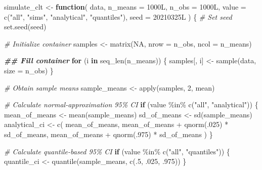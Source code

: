 \documentclass[
  11pt,
]{article}
\newenvironment{Shaded}{\begin{snugshade}}{\end{snugshade}}
\newcommand{\AttributeTok}[1]{\textcolor[rgb]{0.77,0.63,0.00}{#1}}
\newcommand{\CommentTok}[1]{\textcolor[rgb]{0.56,0.35,0.01}{\textit{#1}}}
\newcommand{\ConstantTok}[1]{\textcolor[rgb]{0.00,0.00,0.00}{#1}}
\newcommand{\ControlFlowTok}[1]{\textcolor[rgb]{0.13,0.29,0.53}{\textbf{#1}}}
\newcommand{\DecValTok}[1]{\textcolor[rgb]{0.00,0.00,0.81}{#1}}
\newcommand{\DocumentationTok}[1]{\textcolor[rgb]{0.56,0.35,0.01}{\textbf{\textit{#1}}}}
\newcommand{\FunctionTok}[1]{\textcolor[rgb]{0.00,0.00,0.00}{#1}}
\newcommand{\NormalTok}[1]{#1}
\newcommand{\OtherTok}[1]{\textcolor[rgb]{0.56,0.35,0.01}{#1}}
\newcommand{\SpecialCharTok}[1]{\textcolor[rgb]{0.00,0.00,0.00}{#1}}
\newcommand{\StringTok}[1]{\textcolor[rgb]{0.31,0.60,0.02}{#1}}
\begin{document}
\begin{Shaded}
\begin{Highlighting}[]
\NormalTok{simulate\_clt }\OtherTok{\textless{}{-}} \ControlFlowTok{function}\NormalTok{(}
\NormalTok{  data,}
  \AttributeTok{n\_means =}\NormalTok{ 1000L,}
  \AttributeTok{n\_obs =}\NormalTok{ 1000L,}
  \AttributeTok{value =} \FunctionTok{c}\NormalTok{(}\StringTok{"all"}\NormalTok{, }\StringTok{"sims"}\NormalTok{, }\StringTok{"analytical"}\NormalTok{, }\StringTok{"quantiles"}\NormalTok{),}
  \AttributeTok{seed =}\NormalTok{ 20210325L}
\NormalTok{) \{}
  \CommentTok{\# Set seed}
  \FunctionTok{set.seed}\NormalTok{(seed)}
  
  \CommentTok{\# Initialize container}
\NormalTok{  samples }\OtherTok{\textless{}{-}} \FunctionTok{matrix}\NormalTok{(}\ConstantTok{NA}\NormalTok{, }\AttributeTok{nrow =}\NormalTok{ n\_obs, }\AttributeTok{ncol =}\NormalTok{ n\_means)}
  
  \DocumentationTok{\#\# Fill container}
  \ControlFlowTok{for}\NormalTok{ (i }\ControlFlowTok{in} \FunctionTok{seq\_len}\NormalTok{(n\_means)) \{}
\NormalTok{    samples[, i] }\OtherTok{\textless{}{-}} \FunctionTok{sample}\NormalTok{(data, }\AttributeTok{size =}\NormalTok{ n\_obs)}
\NormalTok{  \}}
  
  \CommentTok{\# Obtain sample means}
\NormalTok{  sample\_means }\OtherTok{\textless{}{-}} \FunctionTok{apply}\NormalTok{(samples, }\DecValTok{2}\NormalTok{, mean)}
  
  \CommentTok{\# Calculate normal{-}approximation 95\% CI}
  \ControlFlowTok{if}\NormalTok{ (value }\SpecialCharTok{\%in\%} \FunctionTok{c}\NormalTok{(}\StringTok{"all"}\NormalTok{, }\StringTok{"analytical"}\NormalTok{)) \{}
\NormalTok{    mean\_of\_means }\OtherTok{\textless{}{-}} \FunctionTok{mean}\NormalTok{(sample\_means)}
\NormalTok{    sd\_of\_means }\OtherTok{\textless{}{-}} \FunctionTok{sd}\NormalTok{(sample\_means)}
\NormalTok{    analytical\_ci }\OtherTok{\textless{}{-}} \FunctionTok{c}\NormalTok{(}
\NormalTok{      mean\_of\_means,}
\NormalTok{      mean\_of\_means }\SpecialCharTok{+} \FunctionTok{qnorm}\NormalTok{(.}\DecValTok{025}\NormalTok{) }\SpecialCharTok{*}\NormalTok{ sd\_of\_means,}
\NormalTok{      mean\_of\_means }\SpecialCharTok{+} \FunctionTok{qnorm}\NormalTok{(.}\DecValTok{975}\NormalTok{) }\SpecialCharTok{*}\NormalTok{ sd\_of\_means}
\NormalTok{    )}
\NormalTok{  \}}
  
  \CommentTok{\# Calculate quantile{-}based 95\% CI}
  \ControlFlowTok{if}\NormalTok{ (value }\SpecialCharTok{\%in\%} \FunctionTok{c}\NormalTok{(}\StringTok{"all"}\NormalTok{, }\StringTok{"quantiles"}\NormalTok{)) \{}
\NormalTok{    quantile\_ci }\OtherTok{\textless{}{-}} \FunctionTok{quantile}\NormalTok{(sample\_means, }\FunctionTok{c}\NormalTok{(.}\DecValTok{5}\NormalTok{, .}\DecValTok{025}\NormalTok{, .}\DecValTok{975}\NormalTok{))}
\NormalTok{  \}}
  

\end{Highlighting}
\end{Shaded}
\end{document}
